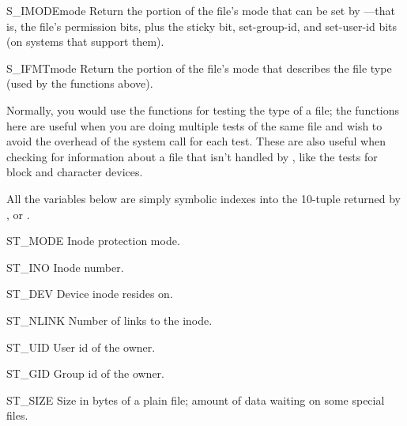 \begin{funcdesc}{S_IMODE}{mode}
Return the portion of the file's mode that can be set by
---that is, the file's permission bits, plus the
sticky bit, set-group-id, and set-user-id bits (on systems that support
them).
\end{funcdesc}

\begin{funcdesc}{S_IFMT}{mode}
Return the portion of the file's mode that describes the file type (used
by the  functions above).
\end{funcdesc}

Normally, you would use the  functions for
testing the type of a file; the functions here are useful when you are
doing multiple tests of the same file and wish to avoid the overhead of
the  system call for each test.  These are also
useful when checking for information about a file that isn't handled
by , like the tests for block and character
devices.

All the variables below are simply symbolic indexes into the 10-tuple
returned by ,  or
.

\begin{datadesc}{ST_MODE}
Inode protection mode.
\end{datadesc}

\begin{datadesc}{ST_INO}
Inode number.
\end{datadesc}

\begin{datadesc}{ST_DEV}
Device inode resides on.
\end{datadesc}

\begin{datadesc}{ST_NLINK}
Number of links to the inode.
\end{datadesc}

\begin{datadesc}{ST_UID}
User id of the owner.
\end{datadesc}

\begin{datadesc}{ST_GID}
Group id of the owner.
\end{datadesc}

\begin{datadesc}{ST_SIZE}
Size in bytes of a plain file; amount of data waiting on some special
files.
\end{datadesc}

